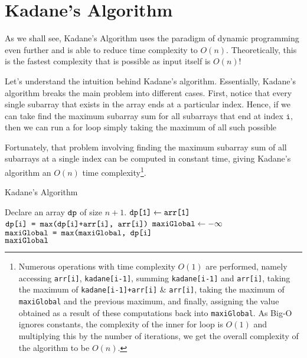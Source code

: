 
\section{Kadane's Algorithm}

As we shall see, Kadane's Algorithm uses the paradigm of dynamic programming even further and is able to reduce time complexity to $O(n).$ Theoretically, this is the fastest complexity that is possible as input itself is $O(n)$! \newline

\noindent Let's understand the intuition behind Kadane's algorithm. Essentially, Kadane's algorithm breaks the main problem into different cases. First, notice that every single subarray that exists in the array ends at a particular index. Hence, if we can take find the maximum subarray sum for all subarrays that end at index $\texttt{i},$ then we can run a for loop simply taking the maximum of all such possible \newline

\noindent Fortunately, that problem involving finding the maximum subarray sum of all subarrays at a single index can be computed in constant time, giving Kadane's algorithm an $O(n)$ time complexity\footnote{Numerous operations with time complexity $O(1)$ are performed, namely accessing \texttt{arr[i]}, \texttt{kadane[i-1]}, summing \texttt{kadane[i-1]} and \texttt{arr[i]}, taking the maximum of \texttt{kadane[i-1]+arr[i]} & \texttt{arr[i]}, taking the maximum of \texttt{maxiGlobal} and the previous maximum, and finally, assigning the value obtained as a result of these computations back into \texttt{maxiGlobal}. As Big-O ignores constants, the complexity of the inner for loop is $O(1)$ and multiplying this by the number of iterations, we get the overall complexity of the algorithm to be $O(n)$.}.

\begin{algorithm}
\caption{Kadane's Algorithm}\label{Kadane}
\begin{algorithmic}[1]
\State Declare an array $\texttt{dp}$ of size $n+1$.
\State $\texttt{dp[1]} \gets \texttt{arr[1]}$
    \State $\texttt{dp[i] = max(dp[i]+arr[i], arr[i])}$
\EndFor
\State $\texttt{maxiGlobal} \gets -\infty$ 
    \State $\texttt{maxiGlobal = max(maxiGlobal, dp[i]}$
\EndFor 
\State \\ \Return $\texttt{maxiGlobal}$
\end{algorithmic}
\end{algorithm}